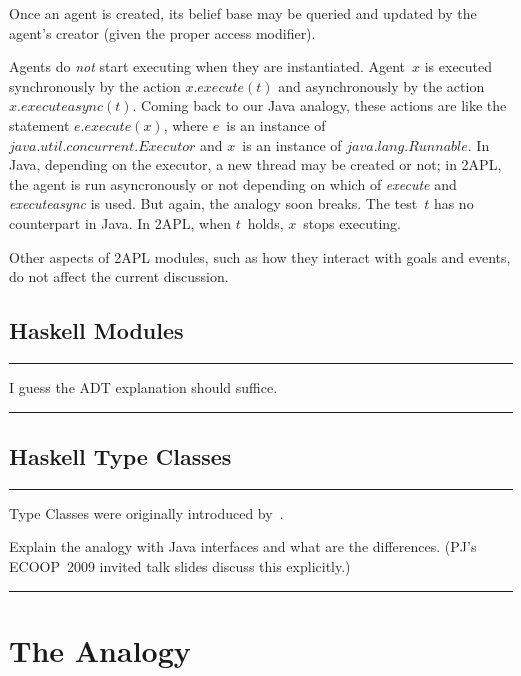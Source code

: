 \documentclass[conference,compsoc]{IEEEtran}
\newenvironment{notes}{\medskip\hrule\nobreak\smallskip\narrower}{\smallskip\hrule\medskip}
\begin{document}
Once an agent is created, its belief base may be queried and updated by the
agent's creator (given the proper access modifier).

Agents do \emph{not} start executing when they are instantiated. Agent~$x$
is executed synchronously by the action $x.\mathit{execute}(t)$ and
asynchronously by the action $x.\mathit{executeasync}(t)$. Coming back to
our Java analogy, these actions are like the statement
$e.\mathit{execute}(x)$, where $e$~is an instance of
$\mathit{java}.\mathit{util}.\mathit{concurrent}.\mathit{Executor}$ and
$x$~is an instance of $\mathit{java}.\mathit{lang}.\mathit{Runnable}$.  In
Java, depending on the executor, a new thread may be created or not; in
2APL, the agent is run asyncronously or not depending on which of
\textit{execute} and \textit{executeasync} is used. But again, the analogy
soon breaks. The test~$t$ has no counterpart in Java. In 2APL, when
$t$~holds, $x$~stops executing.

Other aspects of 2APL modules, such as how they interact with goals and
events, do not affect the current discussion.

\subsection{Haskell Modules}

\begin{notes}
I guess the ADT explanation should suffice.
\end{notes}

\subsection{Haskell Type Classes}

\begin{notes}
Type Classes were originally introduced by~\cite{DBLP:conf/popl/WadlerB89}.

Explain the analogy with Java interfaces and what are the differences.
(PJ's ECOOP~2009 invited talk slides discuss this explicitly.)
\end{notes}

\section{The Analogy}
\end{document}
